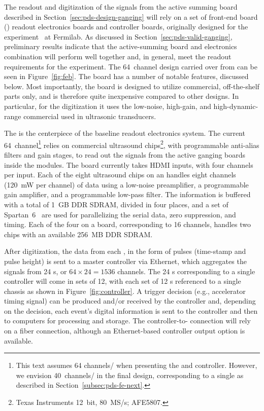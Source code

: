The readout and digitization of the signals from the active summing board described in Section~\ref{sec:pds-design-ganging} will rely on a set of front-end board () readout electronics boards and controller boards, originally designed for the  experiment~\cite{bib:mu2e_tdr}
at Fermilab. As discussed in Section~\ref{sec:pds-valid-ganging}, preliminary results indicate that the active-summing board and  electronics  combination will perform well together and, in general, meet the readout requirements for the experiment. The 64~channel  design carried over from  can be seen in Figure~\ref{fig:feb}. The board has a number of notable features, discussed below. Most importantly,  
the board is designed to utilize commercial, off-the-shelf parts only, and is therefore quite inexpensive compared to other designs. In particular, for the digitization it uses the low-noise, high-gain, and high-dynamic-range commercial  used in ultrasonic transducers. 

The  is the centerpiece of the baseline readout electronics system.  
The current 64~channel\footnote{This text assumes 64 channels/ when presenting the  and controller. However, we envision 40~channels/ in the final design, corresponding to a single  as described in Section~\ref{subsec:pds-fe-next}.}  relies on commercial ultrasound chips\footnote{Texas Instruments\texttrademark{} 12~bit, 80~MS/s; AFE5807.},
with programmable anti-alias filters and gain stages, to read out the  signals from the active ganging boards inside the  modules. The board currently takes HDMI inputs, with four channels per input.  Each of the eight ultrasound chips on an  handles eight channels (\SI{120}{mW} per channel) of data using a low-noise preamplifier, a programmable gain amplifier, and a programmable low-pass filter. The information is buffered with a total of \SI{1}{GB} DDR SDRAM, divided in four places, and a set of Spartan~6\texttrademark~ are used for parallelizing the serial  data, zero suppression, and timing. Each of the four  on a board, corresponding to 16 channels, handles two  chips with an available \SI{256}{MB} DDR SDRAM. 

After digitization, the data from each , in the form of pulses (time-stamp and pulse height) is sent to a master controller via Ethernet, which aggregates the signals from 24 s, or $64\times24=1536$ channels. The 24 s corresponding to a single controller will come in sets of 12, with each set of 12 s referenced to a single chassis as shown in %
Figure~\ref{fig:controller}. A trigger decision (e.g., accelerator timing signal) can be produced and/or received by the controller and, depending on the decision, each event's digital information is sent to the controller and then to  computers for processing and storage. The controller-to- connection will rely on a fiber connection, although an Ethernet-based controller output option is available.

